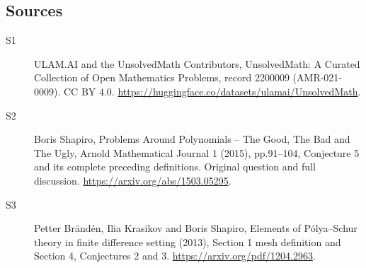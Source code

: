 \documentclass[11pt]{article}
\begin{document}
\subsection{Sources}
\begin{description}
\item[\hypertarget{source:2200009:1}{S1}] ULAM.AI and the UnsolvedMath Contributors, UnsolvedMath: A Curated Collection of Open Mathematics Problems, record 2200009 (AMR-021-0009). CC BY 4.0. \url{https://huggingface.co/datasets/ulamai/UnsolvedMath}.
\item[\hypertarget{source:2200009:2}{S2}] Boris Shapiro, Problems Around Polynomials -- The Good, The Bad and The Ugly, Arnold Mathematical Journal 1 (2015), pp.91--104, Conjecture 5 and its complete preceding definitions. Original question and full discussion. \url{https://arxiv.org/abs/1503.05295}.
\item[\hypertarget{source:2200009:3}{S3}] Petter Brändén, Ilia Krasikov and Boris Shapiro, Elements of Pólya--Schur theory in finite difference setting (2013), Section 1 mesh definition and Section 4, Conjectures 2 and 3. \url{https://arxiv.org/pdf/1204.2963}.
\end{description}
\label{end:2200009}
\end{document}
